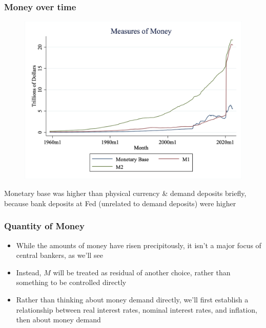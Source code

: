 \documentclass{beamer}
\begin{document}
\begin{frame}
\frametitle[alignment=center]{Money over time}
\begin{figure}
\centering
\includegraphics[scale=0.3]{Figures/MoneyoverTime.png}
\end{figure}
Monetary base was higher than physical currency \& demand deposits briefly, because bank deposits  at Fed (unrelated to demand deposits) were higher
\end{frame}

\begin{frame}
\frametitle[alignment=center]{Quantity of Money}
\begin{itemize}
\item While the amounts of money have risen precipitously, it isn't a major focus of central bankers, as we'll see
\bigskip
\item Instead, $M$ will be treated as residual of another choice, rather than something to be controlled directly
\bigskip
\item Rather than thinking about money demand directly, we'll first establish a relationship between real interest rates, nominal interest rates, and inflation, then about money demand
\end{itemize}
\end{frame}
\end{document}
